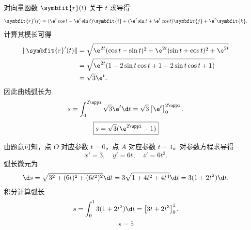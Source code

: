 \begin{solution}

    对向量函数 $\symbfit{r}(t)$ 关于 $t$ 求导得
    \begin{equation}
        \symbfit{r}'(t) = (\e^t \cos t - \e^t \sin t) \symbfit{i} + (\e^t \sin t + \e^t \cos t) \symbfit{j} + \e^t \symbfit{k}.
    \end{equation}
    计算其模长可得
    \begin{equation}
        \begin{aligned}
            \|\symbfit{r}'(t)\| & = \sqrt{\e^{2t}(\cos t - \sin t)^2 + \e^{2t}(\sin t + \cos t)^2 + \e^{2t}} \\
                                & = \sqrt{\e^{2t}(1 - 2\sin t \cos t + 1 + 2\sin t \cos t + 1)}              \\
                                & = \sqrt{3}\e^t.
        \end{aligned}
    \end{equation}
    因此曲线弧长为
    \begin{equation}
        s = \int_{0}^{2\uppi} \sqrt{3}\e^t \d t = \sqrt{3} \left[ \e^t \right]_0^{2\uppi}.
    \end{equation}
    \begin{equation}
        \boxed{s = \sqrt{3}(\e^{2\uppi} - 1)}
    \end{equation}


    由题意可知，点 $O$ 对应参数 $t=0$，点 $A$ 对应参数 $t=1$。对参数方程求导得
    \begin{equation}
        x' = 3, \quad y' = 6t, \quad z' = 6t^2.
    \end{equation}
    弧长微元为
    \begin{equation}
        \d s = \sqrt{3^2 + (6t)^2 + (6t^2)^2} \d t = 3\sqrt{1 + 4t^2 + 4t^4} \d t = 3(1 + 2t^2) \d t.
    \end{equation}
    积分计算弧长
    \begin{equation}
        s = \int_{0}^{1} 3(1 + 2t^2) \d t = \left[ 3t + 2t^3 \right]_0^1.
    \end{equation}
    \begin{equation}
        \boxed{s = 5}
    \end{equation}



\end{solution}

